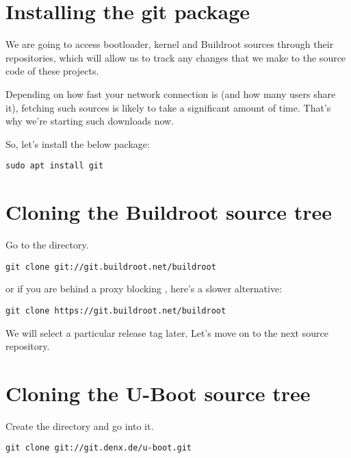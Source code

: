 
\section{Installing the git package}

We are going to access bootloader, kernel and Buildroot sources through
their  repositories, which will allow us to track any changes
that we make to the source code of these projects.

Depending on how fast your network connection is (and how many users
share it), fetching such sources is likely to take a significant amount
of time. That's why we're starting such downloads now.

So, let's install the below package:

\begin{verbatim}
sudo apt install git
\end{verbatim}

\section{Cloning the Buildroot source tree}

Go to the  directory.

\begin{verbatim}
git clone git://git.buildroot.net/buildroot
\end{verbatim}

or if you are behind a proxy blocking , here's a slower
alternative:

\begin{verbatim}
git clone https://git.buildroot.net/buildroot
\end{verbatim}

We will select a particular release tag later. Let's move on to the next
source repository.

\section{Cloning the U-Boot source tree}

Create the  directory and go
into it.

\begin{verbatim}
git clone git://git.denx.de/u-boot.git
\end{verbatim}

